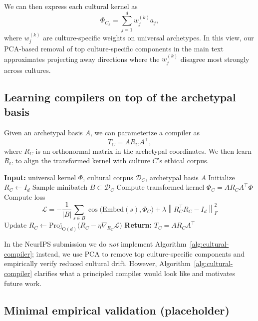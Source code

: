 \documentclass[11pt]{article}
\begin{document}
We can then express each cultural kernel as
\[
\Phi_{C_k} = \sum_{j=1}^d w^{(k)}_j a_j,
\]
where \(w^{(k)}_j\) are culture-specific weights on universal archetypes. In this view, our PCA-based removal of top culture-specific components in the main text approximates projecting away directions where the \(w^{(k)}_j\) disagree most strongly across cultures.

\subsection{Learning compilers on top of the archetypal basis}

Given an archetypal basis \(A\), we can parameterize a compiler as
\[
T_C = A R_C A^{\top},
\]
where \(R_C\) is an orthonormal matrix in the archetypal coordinates. We then learn \(R_C\) to align the transformed kernel with culture \(C\)'s ethical corpus.

\begin{algorithm}[h]
\caption{Conceptual cultural compiler training (archetypal coordinates)}
\label{alg:cultural-compiler}
\begin{algorithmic}[1]
\STATE \textbf{Input:} universal kernel \(\Phi\), cultural corpus \(\mathcal{D}_C\), archetypal basis \(A\)
\STATE Initialize \(R_C \leftarrow I_d\)
    \STATE Sample minibatch \(B \subset \mathcal{D}_C\)
    \STATE Compute transformed kernel \(\Phi_C = A R_C A^{\top} \Phi\)
    \STATE Compute loss
    \[
    \mathcal{L} = - \frac{1}{\lvert B \rvert} \sum_{s \in B} \cos \bigl( \mathrm{Embed}(s), \Phi_C \bigr) + \lambda \left\| R_C^{\top} R_C - I_d \right\|_F^2
    \]
    \STATE Update \(R_C \leftarrow \mathrm{Proj}_{\mathrm{O}(d)} \bigl( R_C - \eta \nabla_{R_C} \mathcal{L} \bigr)\) 
\ENDFOR
\STATE \textbf{Return:} \(T_C = A R_C A^{\top}\)
\end{algorithmic}
\end{algorithm}

In the NeurIPS submission we do \emph{not} implement Algorithm~\ref{alg:cultural-compiler}; instead, we use PCA to remove top culture-specific components and empirically verify reduced cultural drift. However, Algorithm~\ref{alg:cultural-compiler} clarifies what a principled compiler would look like and motivates future work.

\subsection{Minimal empirical validation (placeholder)}
\end{document}
